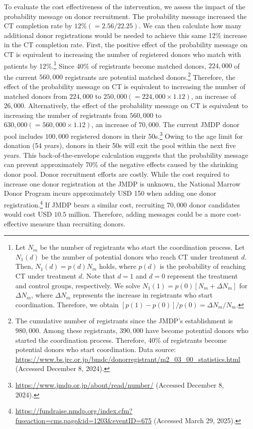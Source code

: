 \documentclass[12pt, a4paper]{article}
\begin{document}
To evaluate the cost effectiveness of the intervention, we assess the impact of the probability message on donor recruitment. The probability message increased the CT completion rate by \(12\% (= 2.56/22.25)\). We can then calculate how many additional donor registrations would be needed to achieve this same 12\% increase in the CT completion rate. First, the positive effect of the probability message on CT is equivalent to increasing the number of registered donors who match with patients by 12\%.\footnote{Let \(N_m\) be the number of registrants who start the coordination process. Let \(N_1(d)\) be the number of potential donors who reach CT under treatment \(d\). Then, \(N_1(d) = p(d)N_m\) holds, where \(p(d)\) is the probability of reaching CT under treatment \(d\). Note that \(d = 1\) and \(d = 0\) represent the treatment and control groups, respectively. We solve \(N_1(1) = p(0)[N_m + \Delta N_m]\) for \(\Delta N_m\), where \(\Delta N_m\) represents the increase in registrants who start coordination. Therefore, we obtain \([p(1) - p(0)]/p(0) = \Delta N_m/N_m\).} Since 40\% of registrants become matched donors, \(224,000\) of the current \(560,000\) registrants are potential matched donors.\footnote{The cumulative number of registrants since the JMDP's establishment is \(980,000\). Among these registrants, \(390,000\) have become potential donors who started the coordination process. Therefore, 40\% of registrants become potential donors who start coordination. Data source: \url{https://www.bs.jrc.or.jp/bmdc/donorregistrant/m2_03_00_statistics.html} (Accessed December 8, 2024).} Therefore, the effect of the probability message on CT is equivalent to increasing the number of matched donors from \(224,000\) to \(250,000 (= 224,000 \times 1.12)\), an increase of \(26,000\). Alternatively, the effect of the probability message on CT is equivalent to increasing the number of registrants from \(560,000\) to \(630,000 (= 560,000 \times 1.12)\), an increase of \(70,000\). The current JMDP donor pool includes \(100,000\) registered donors in their 50s.\footnote{\url{https://www.jmdp.or.jp/about/read/number/} (Accessed December 8, 2024).} Owing to the age limit for donation (54 years), donors in their 50s will exit the pool within the next five years. This back-of-the-envelope calculation suggests that the probability message can prevent approximately 70\% of the negative effects caused by the shrinking donor pool. Donor recruitment efforts are costly. While the cost required to increase one donor registration at the JMDP is unknown, the National Marrow Donor Program incurs approximately USD 150 when adding one donor registration.\footnote{\url{https://fundraise.nmdp.org/index.cfm?fuseaction=cms.page&id=1203&eventID=675} (Accessed March 29, 2025).} If JMDP bears a similar cost, recruiting \(70,000\) donor candidates would cost USD \(10.5\) million. Therefore, adding messages could be a more cost-effective measure than recruiting donors.
\end{document}
